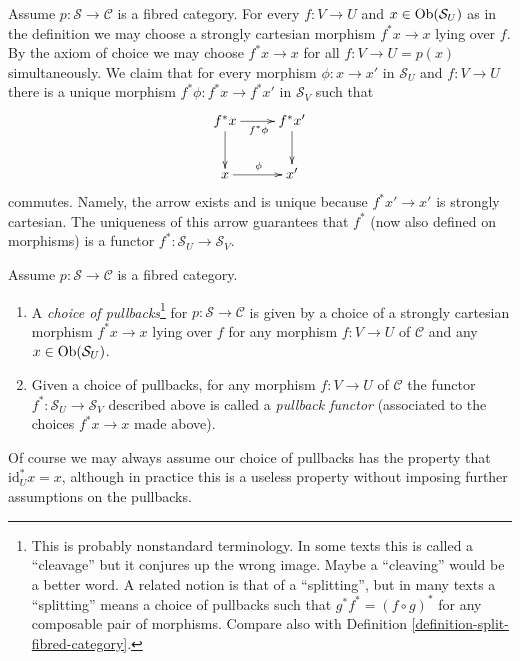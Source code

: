 \noindent
Assume $p : \mathcal{S} \to \mathcal{C}$ is a fibred category.
For every $f : V \to U$ and $x\in \mathop{\mathrm{Ob}}\nolimits(\mathcal{S}_U)$
as in the definition we may choose a strongly cartesian morphism
$f^\ast x \to x$ lying over $f$. By the axiom of choice we may choose
$f^*x \to x$ for all $f: V \to U = p(x)$ simultaneously.
We claim that for every morphism $\phi : x \to x'$ in $\mathcal{S}_U$
and $f : V \to U$ there is a unique
morphism $f^\ast \phi : f^\ast x \to f^\ast x'$ in $\mathcal{S}_V$
such that
$$
\xymatrix{
f^\ast x \ar[r]_{f^\ast \phi} \ar[d] & f^\ast x' \ar[d] \\
x \ar[r]^{\phi} & x' }
$$
commutes. Namely, the arrow exists and is unique because $f^*x' \to x'$ is
strongly cartesian. The uniqueness of this arrow guarantees that
$f^\ast$ (now also defined on morphisms) is a
functor $ f^\ast : \mathcal{S}_U \to \mathcal{S}_V$.

\begin{definition}
\label{definition-pullback-functor-fibred-category}
Assume $p : \mathcal{S} \to \mathcal{C}$ is a fibred category.
\begin{enumerate}
\item A {\it choice of pullbacks}\footnote{This is probably nonstandard
terminology. In some texts this is called a ``cleavage'' but it conjures up
the wrong image. Maybe a ``cleaving'' would be a better word.
A related notion is that of a ``splitting'', but in many texts a ``splitting''
means a choice of pullbacks such that $g^*f^* = (f \circ g)^*$
for any composable pair of morphisms. Compare
also with Definition \ref{definition-split-fibred-category}.}
for $p : \mathcal{S} \to \mathcal{C}$
is given by a choice of a strongly cartesian morphism
$f^\ast x \to x$ lying over $f$ for any morphism
$f: V \to U$ of $\mathcal{C}$ and any $x \in \mathop{\mathrm{Ob}}\nolimits(\mathcal{S}_U)$.
\item Given a choice of pullbacks,
for any morphism $f : V \to U$ of $\mathcal{C}$
the functor $f^* : \mathcal{S}_U \to \mathcal{S}_V$ described
above is called a {\it pullback functor} (associated to the choices
$f^*x \to x$ made above).
\end{enumerate}
\end{definition}

\noindent
Of course we may always assume our choice of pullbacks has the property that
$\text{id}_U^*x = x$, although in practice this is a useless property
without imposing further assumptions on the pullbacks.

